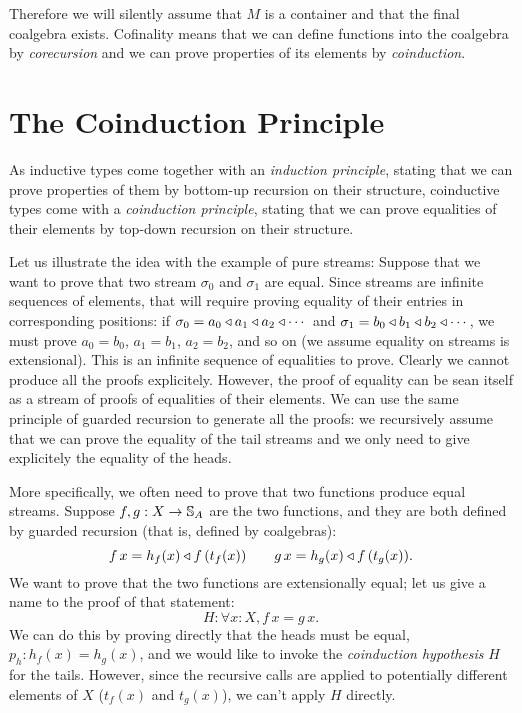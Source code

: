 \documentclass{article}
\begin{document}
Therefore we will silently assume that $M$ is a container and that the final coalgebra exists.
Cofinality means that we can define functions into the coalgebra by {\em corecursion} and we can prove properties of its elements by {\em coinduction}.

\section{The Coinduction Principle}

As inductive types come together with an {\em induction principle}, stating that we can prove properties of them by bottom-up recursion on their structure, coinductive types come with a {\em coinduction principle}, stating that we can prove equalities of their elements by top-down recursion on their structure.

Let us illustrate the idea with the example of pure streams:
Suppose that we want to prove that two stream $\sigma_0$ and $\sigma_1$ are equal.
Since streams are infinite sequences of elements, that will require proving equality of their entries in corresponding positions: if $\sigma_0 = a_0\triangleleft a_1\triangleleft a_2\triangleleft \cdots$ and  $\sigma_1 = b_0\triangleleft b_1\triangleleft b_2\triangleleft \cdots$, we must prove $a_0 = b_0$, $a_1 = b_1$, $a_2=b_2$, and so on (we assume equality on streams is extensional).
This is an infinite sequence of equalities to prove.
Clearly we cannot produce all the proofs explicitely.
However, the proof of equality can be sean itself as a stream of proofs of equalities of their elements.
We can use the same principle of guarded recursion to generate all the proofs: we recursively assume that we can prove the equality of the tail streams and we only need to give explicitely the equality of the heads.

More specifically, we often need to prove that two functions produce equal streams.
Suppose $f,g:X \rightarrow \mathbb{S}_{A}$ are the two functions, and they are both defined by guarded recursion (that is, defined by coalgebras):
$$
f\,x = h_f(x) \triangleleft f\,(t_f(x)) \qquad g\,x = h_g(x) \triangleleft f\,(t_g(x)).
$$
We want to prove that the two functions are extensionally equal; let us give a name to the proof of that statement:
$$
H: \forall x:X, f\,x = g\,x.
$$
We can do this by proving directly that the heads must be equal, $p_h:h_f(x) = h_g(x)$, and we would like to invoke the {\em coinduction hypothesis} $H$ for the tails.
However, since the recursive calls are applied to potentially different elements of $X$ ($t_f(x)$ and $t_g(x)$), we can't apply $H$ directly.
\end{document}
